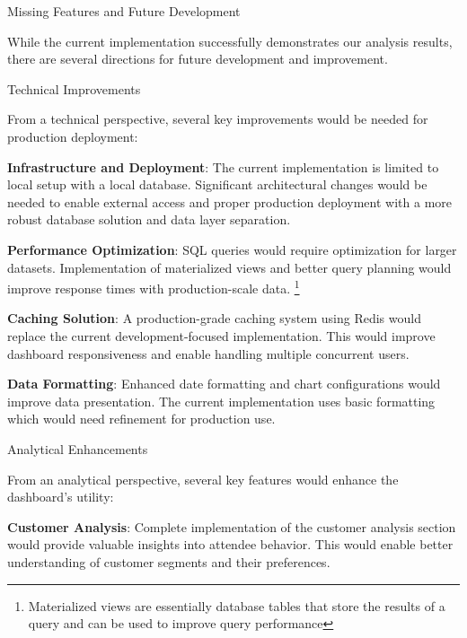 \begin{section}{Missing Features and Future Development}
	\label{sec:future-development}

	While the current implementation successfully demonstrates our analysis results, there are several directions for future development and improvement.

	\begin{subsection}{Technical Improvements}
		\label{subsec:future-technical}

		From a technical perspective, several key improvements would be needed for production deployment:

		\textbf{Infrastructure and Deployment}: The current implementation is limited to local setup with a local database.
		Significant architectural changes would be needed to enable external access and proper production deployment with a more robust database solution and data layer separation.

		\textbf{Performance Optimization}: SQL queries would require optimization for larger datasets.
		Implementation of materialized views and better query planning would improve response times with production-scale data.
		\footnote{Materialized views are essentially database tables that store the results of a query and can be used to improve query performance\cite{tpgdg_current_rules_materializedviews}}

		\textbf{Caching Solution}: A production-grade caching system using Redis would replace the current development-focused implementation.
		This would improve dashboard responsiveness and enable handling multiple concurrent users.

		\textbf{Data Formatting}: Enhanced date formatting and chart configurations would improve data presentation.
		The current implementation uses basic formatting which would need refinement for production use.
	\end{subsection}

	\begin{subsection}{Analytical Enhancements}
		\label{subsec:future-analytical}

		From an analytical perspective, several key features would enhance the dashboard's utility:

		\textbf{Customer Analysis}: Complete implementation of the customer analysis section would provide valuable insights into attendee behavior.
		This would enable better understanding of customer segments and their preferences.


\end{subsection}
\end{section}
